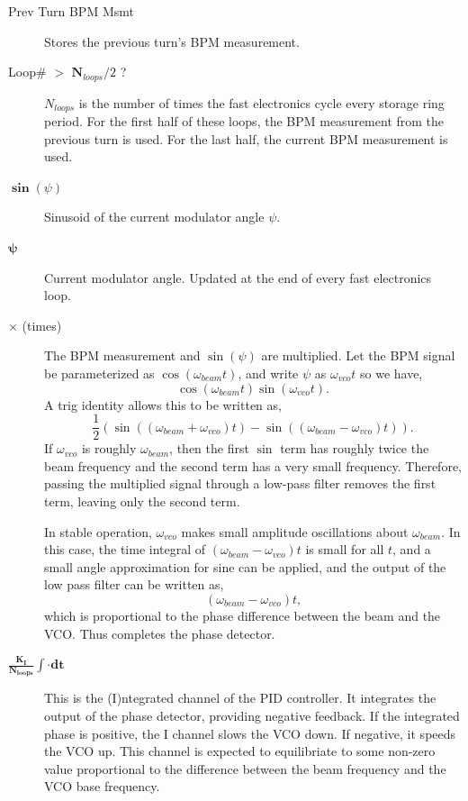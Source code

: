 \begin{description}
\item[Prev Turn BPM Msmt]  Stores the previous turn's BPM measurement.

\item[Loop\# $\boldsymbol >$ $\boldsymbol N_{loops}/2$ ?]  $N_{loops}$ is the number of times the fast electronics cycle every
storage ring period.  For the first half of these loops, the BPM measurement from the previous turn
is used.  For the last half, the current BPM measurement is used.

\item[$\boldsymbol \sin\left(\psi\right)$]  Sinusoid of the current modulator angle $\psi$.

\item[$\boldsymbol \psi$]  Current modulator angle.  Updated at the end of every fast electronics loop.

\item[$\boldsymbol \times$ (times)]  The BPM measurement and $\sin\left(\psi\right)$ are multiplied.  
Let the BPM signal be parameterized as $\cos\left(\omega_{beam}t\right)$, and 
write $\psi$ as $\omega_{vco}t$ so we have,
\begin{equation*}
\cos\left(\omega_{beam}t\right)\sin\left(\omega_{vco}t\right)\textrm{.}
\end{equation*}
A trig identity allows this to be written as,
\begin{equation*}
\frac{1}{2}\left(\sin\left(\left(\omega_{beam}+\omega_{vco}\right)t\right)-
\sin\left(\left(\omega_{beam}-\omega_{vco}\right)t\right)\right)\textrm{.}
\end{equation*}
If $\omega_{vco}$ is roughly $\omega_{beam}$, then the first $\sin$ term has roughly
twice the beam frequency and the second term has a very small frequency.  Therefore, passing
the multiplied signal through a low-pass filter removes the first term, leaving only
the second term.

In stable operation, $\omega_{vco}$ makes small amplitude oscillations about $\omega_{beam}$.
In this case, the time integral of $\left(\omega_{beam}-\omega_{vco}\right)t$ is small for
all $t$, and a small angle approximation for sine can be applied, and the output of the 
low pass filter can be written as,
\begin{equation}
\left(\omega_{beam}-\omega_{vco}\right)t\textrm{,}
\end{equation}
which is proportional to the phase difference between the beam and the VCO.  Thus completes
the phase detector.

\item[$\boldsymbol{\frac{K_I}{N_{loops}}\int\cdot dt}$]  This is the (I)ntegrated channel of the PID controller.
It integrates the output of the phase detector, providing negative feedback.  If the integrated phase
is positive, the I channel slows the VCO down.  If negative, it speeds the VCO up.  This channel is expected
to equilibriate to some non-zero value proportional to the difference between the beam
frequency and the VCO base frequency.


\end{description}
